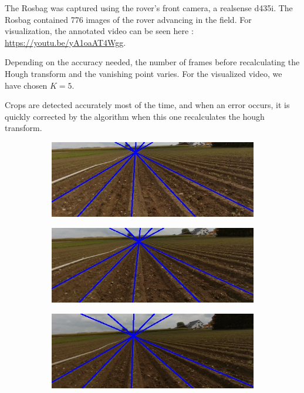 The Rosbag was captured using the rover's front camera, a realsense d435i.  
The Rosbag contained 776 images of the rover advancing in the field. For visualization, the annotated video can be seen here : \url{https://youtu.be/yA1oaAT4Wgg}.

Depending on the accuracy needed, the number of frames before recalculating the Hough transform and the vanishing point varies. For the visualized video, we have chosen $K=5$.

Crops are detected accurately most of the time, and when an error occurs, it is quickly corrected by the algorithm when this one recalculates the hough transform.

\begin{figure}
\centering
\begin{subfigure}{0.49\textwidth}
    \includegraphics[width=\textwidth]{Report/images/rgb000.jpg}
    \label{fig:first}
\end{subfigure}
\begin{subfigure}{0.49\textwidth}
    \includegraphics[width=\textwidth]{Report/images/rgb200.jpg}
    \label{fig:first}
\end{subfigure}
\begin{subfigure}{0.49\textwidth}
    \includegraphics[width=\textwidth]{Report/images/rgb400.jpg}

\end{subfigure}
\end{figure}
